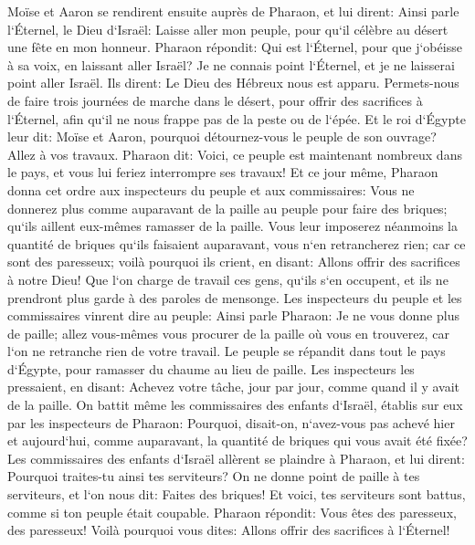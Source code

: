 \verse Moïse et Aaron se rendirent ensuite auprès de Pharaon, et lui dirent: Ainsi parle l`Éternel, le Dieu d`Israël: Laisse aller mon peuple, pour qu`il célèbre au désert une fête en mon honneur. 
\verse Pharaon répondit: Qui est l`Éternel, pour que j`obéisse à sa voix, en laissant aller Israël? Je ne connais point l`Éternel, et je ne laisserai point aller Israël. 
\verse Ils dirent: Le Dieu des Hébreux nous est apparu. Permets-nous de faire trois journées de marche dans le désert, pour offrir des sacrifices à l`Éternel, afin qu`il ne nous frappe pas de la peste ou de l`épée. 
\verse Et le roi d`Égypte leur dit: Moïse et Aaron, pourquoi détournez-vous le peuple de son ouvrage? Allez à vos travaux. 
\verse Pharaon dit: Voici, ce peuple est maintenant nombreux dans le pays, et vous lui feriez interrompre ses travaux! 
\verse Et ce jour même, Pharaon donna cet ordre aux inspecteurs du peuple et aux commissaires: 
\verse Vous ne donnerez plus comme auparavant de la paille au peuple pour faire des briques; qu`ils aillent eux-mêmes ramasser de la paille. 
\verse Vous leur imposerez néanmoins la quantité de briques qu`ils faisaient auparavant, vous n`en retrancherez rien; car ce sont des paresseux; voilà pourquoi ils crient, en disant: Allons offrir des sacrifices à notre Dieu! 
\verse Que l`on charge de travail ces gens, qu`ils s`en occupent, et ils ne prendront plus garde à des paroles de mensonge. 
\verse Les inspecteurs du peuple et les commissaires vinrent dire au peuple: Ainsi parle Pharaon: Je ne vous donne plus de paille; 
\verse allez vous-mêmes vous procurer de la paille où vous en trouverez, car l`on ne retranche rien de votre travail. 
\verse Le peuple se répandit dans tout le pays d`Égypte, pour ramasser du chaume au lieu de paille. 
\verse Les inspecteurs les pressaient, en disant: Achevez votre tâche, jour par jour, comme quand il y avait de la paille. 
\verse On battit même les commissaires des enfants d`Israël, établis sur eux par les inspecteurs de Pharaon: Pourquoi, disait-on, n`avez-vous pas achevé hier et aujourd`hui, comme auparavant, la quantité de briques qui vous avait été fixée? 
\verse Les commissaires des enfants d`Israël allèrent se plaindre à Pharaon, et lui dirent: Pourquoi traites-tu ainsi tes serviteurs? 
\verse On ne donne point de paille à tes serviteurs, et l`on nous dit: Faites des briques! Et voici, tes serviteurs sont battus, comme si ton peuple était coupable. 
\verse Pharaon répondit: Vous êtes des paresseux, des paresseux! Voilà pourquoi vous dites: Allons offrir des sacrifices à l`Éternel! 
